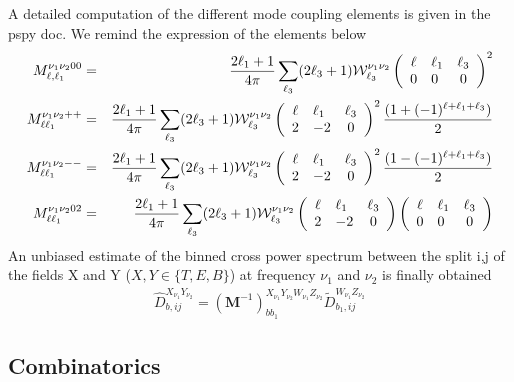 \documentclass[a4paper, 11pt]{article}
\def\ba{\begin{eqnarray}}
\def\ea{\end{eqnarray}}
\begin{document}
A detailed computation of the different mode coupling elements is given in the pspy doc. We remind the expression of the elements below
\ba
M^{\nu_{1}\nu_{2}00}_{ \ell, \ell_1} &=&   \frac{2\ell_1 +1}{4\pi}  \sum_{ \ell_3} (2\ell_3+1) {\cal W}^{\nu_{1}\nu_{2}}_{\ell_3} 
\left(\begin{array}{clcr}
\ell & \ell_1 & \ell_3\\
0 & 0 & 0 \end{array}\right)^{2} \nonumber \\
M^{\nu_{1}\nu_{2}++}_{\ell \ell_{1}} &=& \frac{2\ell_1 +1}{4\pi}  \sum_{\ell_{3}} (2\ell_3 +1) {\cal W}^{\nu_{1}\nu_{2}}_{\ell_3} \left(\begin{array}{clcr}
\ell & \ell_1 & \ell_3\\
2 & -2 & 0 \end{array}\right)^{2} \frac{(1+ (-1)^{\ell + \ell_1 + \ell_3})}{2} \nonumber \\
M^{\nu_{1}\nu_{2}--}_{\ell \ell_{1}} &=& \frac{2\ell_1 +1}{4\pi}  \sum_{\ell_{3}} (2\ell_3 +1) {\cal W}^{\nu_{1}\nu_{2}}_{\ell_3} \left(\begin{array}{clcr}
\ell & \ell_1 & \ell_3\\
2 & -2 & 0 \end{array}\right)^{2} \frac{(1- (-1)^{\ell + \ell_1 + \ell_3})}{2} \nonumber \\
M^{\nu_{1}\nu_{2}02}_{\ell \ell_{1}} &=& \frac{2\ell_1 +1}{4\pi}  \sum_{\ell_{3}} (2\ell_3 +1) {\cal W}^{\nu_{1}\nu_{2}}_{\ell_3} \left(\begin{array}{clcr}
\ell & \ell_1 & \ell_3\\
2 & -2 & 0 \end{array}\right) 
\left(\begin{array}{clcr}
\ell & \ell_1 & \ell_3\\
0 & 0 & 0 \end{array}\right)
\ea
An unbiased estimate of the binned cross power spectrum between the split i,j of the fields X and Y ($X, Y \in \{T,E,B \}$) at frequency $\nu_{1}$ and $\nu_{2}$ is finally obtained
\ba
\hat{D}_{b, ij}^{X_{\nu_{1}}Y_{\nu_{2}}}= (\bm{M}^{-1})^{X_{\nu_{1}}Y_{\nu_{2}}W_{\nu_{1}}Z_{\nu_{2}}}_{bb_{1}} \tilde{D}_{b_{1}, ij}^{W_{\nu_{1}}Z_{\nu_{2}}}
\ea

\subsection{Combinatorics}
\end{document}
